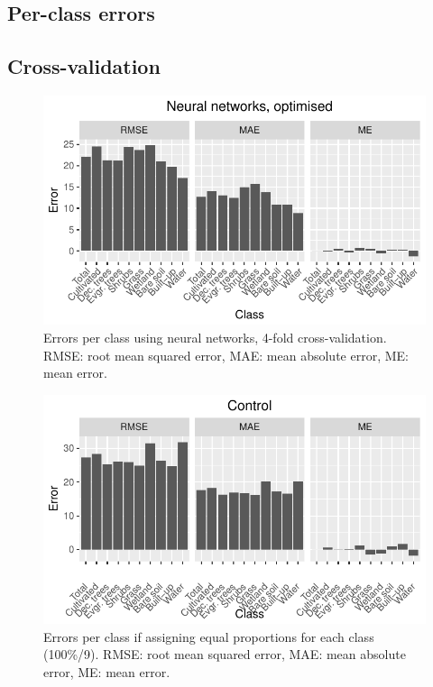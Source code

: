 \documentclass[a4paper,10pt]{book}
\begin{document}
\begin{appendices}
 \chapter{Per-class errors}
 \section{Cross-validation}
 \begin{figure}
  \centering
  \includegraphics[width=\textwidth]{../plot/perclass-errors-nn}
  \caption{Errors per class using neural networks, 4-fold cross-validation. RMSE: root mean squared error, MAE: mean absolute error, ME: mean error.}
  \label{fig-perclass-errors-nn}
 \end{figure}
 \begin{figure}
  \centering
  \includegraphics[width=\textwidth]{../plot/perclass-errors-ctrl}
  \caption{Errors per class if assigning equal proportions for each class (100\%/9). RMSE: root mean squared error, MAE: mean absolute error, ME: mean error.}
  \label{fig-perclass-errors-ctrl}
 \end{figure}
 

\end{appendices}
\end{document}
